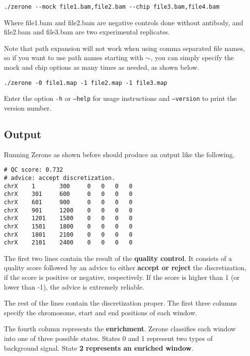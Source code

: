 \documentclass[12pt]{article}
\begin{document}
\begin{verbatim}
./zerone --mock file1.bam,file2.bam --chip file3.bam,file4.bam
\end{verbatim}

Where file1.bam and file2.bam are negative controls done without antibody,
and file2.bam and file3.bam are two experimental replicates.

Note that path expansion will not work when using comma separated file names,
so if you want to use path names starting with $\sim$, you can simply
specify the mock and chip options as many times as needed, as shown below.

\begin{verbatim}
./zerone -0 file1.map -1 file2.map -1 file3.map
\end{verbatim}

Enter the option \texttt{-h} or \texttt{--help} for usage instructions and
\texttt{--version} to print the version number.

\subsection{Output}

Running Zerone as shown before should produce an output like the following.

\begin{verbatim}
# QC score: 0.732
# advice: accept discretization.
chrX    1       300     0   0   0   0
chrX    301     600     0   0   0   0
chrX    601     900     0   0   0   0
chrX    901     1200    0   0   0   0
chrX    1201    1500    0   0   0   0
chrX    1501    1800    0   0   0   0
chrX    1801    2100    0   0   0   0
chrX    2101    2400    0   0   0   0
\end{verbatim}

\begin{mdframed}
The first two lines contain the result of the \textbf{quality control}.
It consists of a quality score followed by an advice to either
\textbf{accept or reject} the discretization, if the score is positive or
negative, respectively. If the score is higher than 1 (or lower than -1), the
advice is extremely reliable.
\end{mdframed}

The rest of the lines contain the discretization proper. The first three columns
specify the chromosome, start and end positions of each window.

\begin{mdframed}
The fourth column represents the \textbf{enrichment}. Zerone classifies
each window into one of three possible states. States 0 and 1 represent two
types of background signal. State \textbf{2 represents an enriched window}.
\end{mdframed}
\end{document}
